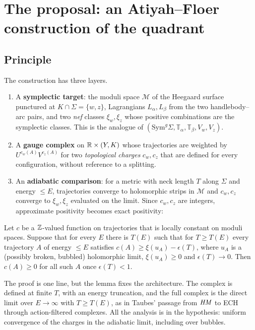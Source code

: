 \section{The proposal: an Atiyah--Floer construction of the quadrant}\label{sec:proposal}

\subsection{Principle}
The construction has three layers.
\begin{enumerate}[label=(\Roman*),leftmargin=2.4em]
\item A \textbf{symplectic target}: the moduli space $\mathcal M$ of the Heegaard surface punctured at
$K\cap\Sigma=\{w,z\}$, Lagrangians $L_\alpha,L_\beta$ from the two handlebody--arc pairs, and two
\emph{nef} classes $\xi_w,\xi_z$ whose positive combinations are the symplectic classes.  This is the
analogue of $(\mathrm{Sym}^g\Sigma,\mathbb T_\alpha,\mathbb T_\beta,V_w,V_z)$.
\item A \textbf{gauge complex} on $\mathbb{R}\times(Y,K)$ whose trajectories are weighted by
$U^{c_w(A)}V^{c_z(A)}$ for two \emph{topological charges} $c_w,c_z$ that are defined for every
configuration, without reference to a splitting.
\item An \textbf{adiabatic comparison}: for a metric with neck length $T$ along $\Sigma$ and energy
$\le E$, trajectories converge to holomorphic strips in $\mathcal M$ and $c_w,c_z$ converge to
$\xi_w,\xi_z$ evaluated on the limit.  Since $c_w,c_z$ are integers, approximate positivity becomes exact
positivity:
\end{enumerate}

\begin{lemma}\label{lem:bootstrap}
Let $c$ be a $\mathbb{Z}$-valued function on trajectories that is locally constant on moduli spaces.  Suppose that
for every $E$ there is $T(E)$ such that for $T\ge T(E)$ every trajectory $A$ of energy $\le E$ satisfies
$c(A)\ge \xi(u_A)-\epsilon(T)$, where $u_A$ is a (possibly broken, bubbled) holomorphic limit, $\xi(u_A)\ge0$
and $\epsilon(T)\to0$.  Then $c(A)\ge0$ for all such $A$ once $\epsilon(T)<1$.
\end{lemma}
The proof is one line, but the lemma fixes the architecture.  The complex is defined at finite $T$, with
an energy truncation, and the full complex is the direct limit over $E\to\infty$ with $T\ge T(E)$,
as in Taubes' passage from $\mathit{HM}$ to ECH through action-filtered complexes.  All the analysis is in the
hypothesis: uniform convergence of the charges in the adiabatic limit, including over bubbles.

